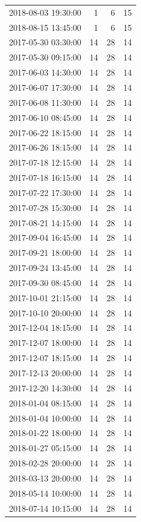 \begin{tabular}{lrrr}
2018-08-03 19:30:00 & 1 & 6 & 15 \\
2018-08-15 13:45:00 & 1 & 6 & 15 \\
2017-05-30 03:30:00 & 14 & 28 & 14 \\
2017-05-30 09:15:00 & 14 & 28 & 14 \\
2017-06-03 14:30:00 & 14 & 28 & 14 \\
2017-06-07 17:30:00 & 14 & 28 & 14 \\
2017-06-08 11:30:00 & 14 & 28 & 14 \\
2017-06-10 08:45:00 & 14 & 28 & 14 \\
2017-06-22 18:15:00 & 14 & 28 & 14 \\
2017-06-26 18:15:00 & 14 & 28 & 14 \\
2017-07-18 12:15:00 & 14 & 28 & 14 \\
2017-07-18 16:15:00 & 14 & 28 & 14 \\
2017-07-22 17:30:00 & 14 & 28 & 14 \\
2017-07-28 15:30:00 & 14 & 28 & 14 \\
2017-08-21 14:15:00 & 14 & 28 & 14 \\
2017-09-04 16:45:00 & 14 & 28 & 14 \\
2017-09-21 18:00:00 & 14 & 28 & 14 \\
2017-09-24 13:45:00 & 14 & 28 & 14 \\
2017-09-30 08:45:00 & 14 & 28 & 14 \\
2017-10-01 21:15:00 & 14 & 28 & 14 \\
2017-10-10 20:00:00 & 14 & 28 & 14 \\
2017-12-04 18:15:00 & 14 & 28 & 14 \\
2017-12-07 18:00:00 & 14 & 28 & 14 \\
2017-12-07 18:15:00 & 14 & 28 & 14 \\
2017-12-13 20:00:00 & 14 & 28 & 14 \\
2017-12-20 14:30:00 & 14 & 28 & 14 \\
2018-01-04 08:15:00 & 14 & 28 & 14 \\
2018-01-04 10:00:00 & 14 & 28 & 14 \\
2018-01-22 18:00:00 & 14 & 28 & 14 \\
2018-01-27 05:15:00 & 14 & 28 & 14 \\
2018-02-28 20:00:00 & 14 & 28 & 14 \\
2018-03-13 20:00:00 & 14 & 28 & 14 \\
2018-05-14 10:00:00 & 14 & 28 & 14 \\
2018-07-14 10:15:00 & 14 & 28 & 14 \\

\end{tabular}
